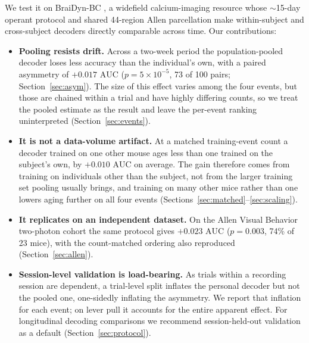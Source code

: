 \documentclass[mlmain,onecolumn]{jmlr}
\newcommand{\auc}{\mathrm{AUC}}
\begin{document}
We test it on BraiDyn-BC \citep{kondo2025}, a widefield calcium-imaging resource whose $\sim$15-day
operant protocol and shared 44-region Allen parcellation make within-subject and cross-subject
decoders directly comparable across time. Our contributions:
\begin{itemize}\itemsep2pt
\item \textbf{Pooling resists drift.} Across a two-week period the population-pooled decoder loses
less accuracy than the individual's own, with a paired asymmetry of $+0.017$ $\auc$
($p = 5 \times 10^{-5}$, 73 of 100 pairs; Section~\ref{sec:asym}). The size of this effect varies
among the four events, but those are chained within a trial and have highly differing counts, so we
treat the pooled estimate as the result and leave the per-event ranking uninterpreted
(Section~\ref{sec:events}).
\item \textbf{It is not a data-volume artifact.} At a matched training-event count a decoder trained
on one other mouse ages less than one trained on the subject's own, by $+0.010$ $\auc$ on average.
The gain therefore comes from training on individuals other than the subject, not from the larger
training set pooling usually brings, and training on many other mice rather than one lowers aging
further on all four events (Sections~\ref{sec:matched}--\ref{sec:scaling}).
\item \textbf{It replicates on an independent dataset.} On the Allen Visual Behavior two-photon
cohort the same protocol gives $+0.023$ $\auc$ ($p = 0.003$, 74\% of 23 mice), with the
count-matched ordering also reproduced (Section~\ref{sec:allen}).
\item \textbf{Session-level validation is load-bearing.} As trials within a recording session are
dependent, a trial-level split inflates the personal decoder but not the pooled one, one-sidedly
inflating the asymmetry. We report that inflation for each event; on lever pull it accounts for the
entire apparent effect. For longitudinal decoding comparisons we recommend session-held-out
validation as a default (Section~\ref{sec:protocol}).
\end{itemize}
\end{document}
